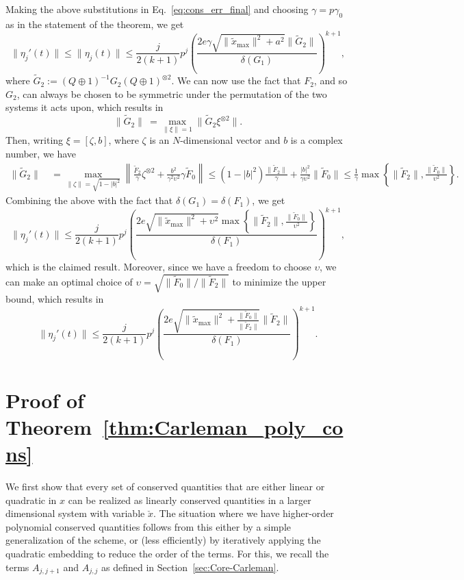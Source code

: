 \documentclass[superscriptaddress,onecolumn,nofootinbib,longbibliography,a4paper,accepted=2026-09-29]{quantumarticle}
\theoremstyle{plain}
\theoremstyle{definition}
\numberwithin{thm}{section}
\numberwithin{assumption}{section}
\numberwithin{lemma}{section}
\numberwithin{prop}{section}
\numberwithin{cor}{section}
\numberwithin{definition}{section}
\numberwithin{rmk}{section}
\numberwithin{equation}{section}
\begin{document}
Making the above substitutions in Eq.~\eqref{eq:cons_err_final} and choosing $\gamma=p\gamma_0$ as in the statement of the theorem, we get
\begin{equation}
    \label{eq:error_cons_4}
    \|\eta_j'(t)\|\leq \|\eta_j(t)\| \leq   \frac{j}{2(k+1)}p^j \left(\frac{2e\gamma \sqrt{\|\tilde{x}_{\mathrm{max}}\|^2+ a^2} \|\tilde{G}_2\|}{\delta(G_1)} \right)^{k+1},
\end{equation}
where $\tilde{G}_2:=(Q\oplus 1)^{-1} G_2(Q\oplus 1)^{\otimes 2}$. We can now use the fact that $F_2$, and so $G_2$, can always be chosen to be symmetric under the permutation of the two systems it acts upon, which results in
\begin{equation}
    \|\tilde{G}_2\|\ = \max_{\|\xi\|=1}  \|\tilde{G}_2 \xi^{\otimes 2}\|. 
\end{equation}
Then, writing $\xi=[\zeta,b]$, where $\zeta$ is an $N$-dimensional vector and $b$ is a complex number, we have
\begin{align}
    \|\tilde{G}_2\|\ &= \max_{\|\zeta\|=\sqrt{1-|b|^2}}  \left\| \frac{\tilde{F}_2}{\gamma} \zeta^{\otimes 2} + \frac{b^2}{\gamma^2 \upsilon^2} \gamma \tilde{F}_0\right\| \leq (1-|b|^2) \frac{\|\tilde{F}_2\|}{\gamma} + \frac{|b|^2}{\gamma \upsilon^2}\|\tilde{F}_0\| \leq \frac{1}{\gamma}\max\left\{\|\tilde{F}_2\|,\frac{\|\tilde{F}_0\|}{\upsilon^2}\right\}. 
\end{align}
Combining the above with the fact that $\delta(G_1)=\delta(F_1)$, we get 
\begin{equation}
     \|\eta_j'(t)\|\leq  \frac{j}{2(k+1)}p^j \left(\frac{2e\sqrt{\|\tilde{x}_{\mathrm{max}}\|^2+\upsilon^2} \max\left\{\|\tilde{F}_2\|,\frac{\|\tilde{F}_0\|}{\upsilon^2}\right\}}{\delta(F_1)} \right)^{k+1},
\end{equation}
which is the claimed result. Moreover, since we have a freedom to choose $\upsilon$, we can make an optimal choice of $\upsilon=\sqrt{\|\tilde{F}_0\|/\|\tilde{F}_2\|}$ to minimize the upper bound, which results in
\begin{equation}
    \|\eta_j'(t)\| \leq   \frac{j}{2(k+1)}p^j \left(\frac{2e\sqrt{\|\tilde{x}_{\mathrm{max}}\|^2+\frac{\|\tilde{F}_0\|}{\|\tilde{F}_2\|}} \|\tilde{F}_2\|}{\delta(F_1)} \right)^{k+1}.
\end{equation}

\section{Proof of Theorem~\ref{thm:Carleman_poly_cons}}
\label{apps:Carleman_poly_cons}
We first show that every set of conserved quantities that are either linear or quadratic in $x$ can be realized as linearly conserved quantities in a larger dimensional system with variable $\check{x}$. The situation where we have higher-order polynomial conserved quantities follows from this either by a simple generalization of the scheme, or (less efficiently) by iteratively applying the quadratic embedding to reduce the order of the terms. For this, we recall the terms $A_{j,j+1}$ and $A_{j,j}$ as defined in Section~\ref{sec:Core-Carleman}. 
\end{document}
